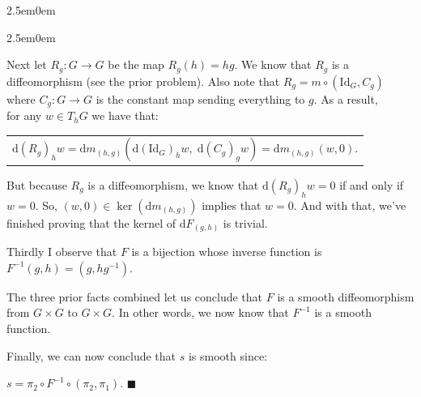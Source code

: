 \documentclass{book}
\newenvironment{myIndent}{%
   \begin{adjustwidth}{2.5em}{0em}%
}{%
   \end{adjustwidth}%
}
\newcommand{\myId}{\mathrm{Id}}
\newcommand{\df}{\mathrm{d}}
\newcommand{\retTwo}{\hfill\bigbreak}
\begin{document}
\begin{myIndent}
\begin{myIndent}
		Next let $R_g: G \to G$ be the map $R_g(h) = hg$. We know that $R_g$ is a\\ diffeomorphism (see the prior problem). Also note that $R_g = m \circ (\myId_G, C_g)$\\ where $C_g: G \to G$ is the constant map sending everything to $g$. As a result,\\ for any $w \in T_h G$ we have that:

		{\centering\begin{tabular}{l}
			$\df (R_g)_h w = \df m_{(h, g)}(\df (\myId_G)_h w, \phantom{.} \df (C_g)_g w) = \df m_{(h, g)}(w, 0)$.
		\end{tabular}\retTwo\par}

		But because $R_g$ is a diffeomorphism, we know that $\df (R_g)_h w = 0$ if and only if\\ $w = 0$. So, $(w, 0) \in \ker(\df m_{(h, g)})$ implies that $w = 0$. And with that, we've finished proving that the kernel of $\df F_{(g, h)}$ is trivial.\retTwo
	\end{myIndent}

	Thirdly I observe that $F$ is a bijection whose inverse function is $F^{-1}(g, h) = (g, hg^{-1})$.\retTwo

	The three prior facts combined let us conclude that $F$ is a smooth diffeomorphism from $G \times G$ to $G \times G$. In other words, we now know that $F^{-1}$ is a smooth function.\retTwo

	Finally, we can now conclude that $s$ is smooth since:

	{\centering $s = \pi_2 \circ F^{-1} \circ (\pi_2, \pi_1)$. $\blacksquare$ \retTwo\par}
\end{myIndent}
\end{document}
